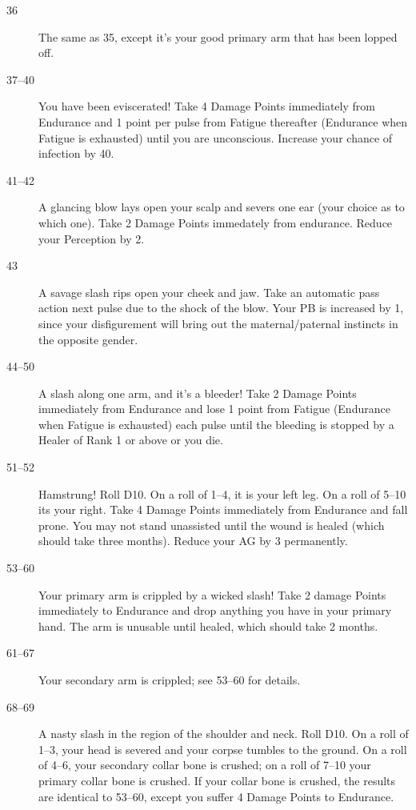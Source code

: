 \begin{multicols}{3}
{\begin{description}
\item[36] The same as 35, except it's your good primary arm that has
been lopped off.

\item[37--40] You have been eviscerated!  Take 4 Damage Points
immediately from Endurance and 1 point per pulse from Fatigue
thereafter (Endurance when Fatigue is exhausted) until you are
unconscious.  Increase your chance of infection by 40.

\item[41--42] A glancing blow lays open your scalp and severs one ear
(your choice as to which one).  Take 2 Damage Points immedately from
endurance.  Reduce your Perception by 2.

\item[43] A savage slash rips open your cheek and jaw.  Take an
automatic pass action next pulse due to the shock of the blow.  Your PB
is increased by 1, since your disfigurement will bring out the
maternal/paternal instincts in the opposite gender.

\item[44--50] A slash along one arm, and it's a bleeder!  Take 2
Damage Points immediately from Endurance and lose 1 point from Fatigue
(Endurance when Fatigue is exhausted) each pulse until the bleeding is
stopped by a Healer of Rank 1 or above or you die.

\item[51--52] Hamstrung!  Roll D10.  On a roll of 1--4, it is your
left leg.  On a roll of 5--10 its your right.  Take 4 Damage Points
immediately from Endurance and fall prone.  You may not stand
unassisted until the wound is healed (which should take three months).
Reduce your AG by 3 permanently.

\item[53--60] Your primary arm is crippled by a wicked slash!  Take 2
damage Points immediately to Endurance and drop anything you have in
your primary hand.  The arm is unusable until healed, which should
take 2 months.

\item[61--67] Your secondary arm is crippled; see 53--60 for details.

\item[68--69] A nasty slash in the region of the shoulder and neck.
Roll D10.  On a roll of 1--3, your head is severed and your corpse
tumbles to the ground.  On a roll of 4--6, your secondary collar bone
is crushed; on a roll of 7--10 your primary collar bone is crushed.
If your collar bone is crushed, the results are identical to 53--60,
except you suffer 4 Damage Points to Endurance.


\end{description}}
\end{multicols}
